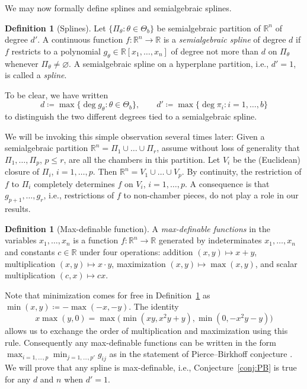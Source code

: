 \documentclass[11pt]{amsart}
\theoremstyle{plain}
\theoremstyle{definition}
\newtheorem{definition}[theorem]{Definition}
\begin{document}
We may now formally define splines and semialgebraic splines.
\begin{definition}[Splines]\label{def:piecewise}
Let $\{\Pi_{\theta} : \theta \in \Theta_b \}$  be semialgebraic partition of $\mathbb{R}^n$ of degree $d'$. A continuous function $f: \mathbb{R}^n \to \mathbb{R}$ is a \emph{semialgebraic spline} of degree $d$  if $f$ restricts to  a polynomial  $g_\theta  \in \mathbb{R}[x_1, \dots, x_n]$ of degree not more than $d$ on $\Pi_\theta$ whenever $\Pi_\theta \ne \varnothing$.
A semialgebraic spline on a hyperplane partition, i.e., $d' = 1$, is called a \emph{spline}.
\end{definition}
To be clear, we have written
\[
d \coloneqq \max \{ \deg g_\theta : \theta \in \Theta_b \},  \qquad  d' \coloneqq \max \{ \deg \pi_i : i = 1, \dots, b\}
\]
to distinguish the two different degrees tied to a semialgebraic spline.

We will be invoking this simple observation several times later: Given a semialgebraic partition $\mathbb{R}^n = \Pi_1 \cup \dots \cup \Pi_r$, assume without loss of generality that $\Pi_1,\dots,\Pi_p$, $p \le r$, are all the chambers in this partition. Let $V_i$ be the (Euclidean) closure of $\Pi_i$, $i = 1,\dots,p$. Then $\mathbb{R}^n = V_1 \cup \dots \cup V_p$. By continuity, the restriction of $f$ to $\Pi_i$ completely determines $f$ on $V_i$, $i=1,\dots,p$.  A consequence is that $g_{p+1},\dots,g_r$, i.e., restrictions of $f$ to non-chamber pieces, do not play a role in our results.

\begin{definition}[Max-definable function]\label{def:maxdef}
A \emph{max-definable functions} in the variables $x_1,\dots,x_n$ is a function $f : \mathbb{R}^n \to \mathbb{R}$  generated by indeterminates $x_1, \dots, x_n$ and constants $c\in \mathbb{R}$ under four operations: addition $(x,y) \mapsto x+y$, multiplication $(x,y) \mapsto x \cdot y$, maximization $(x,y) \mapsto \max(x,y)$, and scalar multiplication $(c, x) \mapsto cx$.
\end{definition}
Note that minimization comes for free in Definition~\ref{def:maxdef} as $\min(x,y) \coloneqq -\max(-x,-y)$. The identity
\[
x\max(y,0) = \max\bigl(\min(xy, x^2y+y), \min(0, -x^2y-y)\bigr)
\]
allows us to exchange the order of multiplication and maximization using this rule. Consequently any max-definable functions can be written in the form $\max_{i=1,\dots,p}\min_{j=1,\dots,p'} g_{ij}$ as in the statement of Pierce--Birkhoff conjecture \cite{HI}. We will prove that any spline is max-definable, i.e., Conjecture~\ref{conj:PB} is true for any $d$ and $n$ when $d' = 1$.
\end{document}
